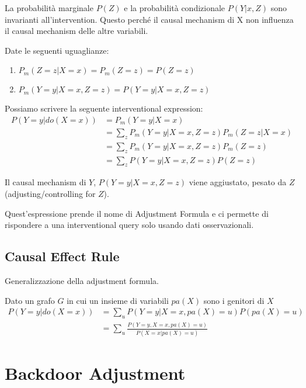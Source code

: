 La probabilità marginale $P(Z)$ e la probabilità condizionale $P(Y|x,Z)$ sono invarianti all'intervention.
Questo perché il causal mechanism di X non influenza il causal mechanism delle altre variabili.

Date le seguenti uguaglianze:

\begin{enumerate}
  \item $P_m(Z=z | X=x) = P_m(Z=z) = P(Z=z)$
  \item $P_m(Y=y|X=x, Z=z) = P(Y=y|X=x, Z=z)$
\end{enumerate}

Possiamo scrivere la seguente interventional expression:
\begin{align*}
  P(Y=y|do(X=x)) & = P_m(Y=y|X=x)                            \\
                 & = \sum_z P_m(Y=y|X=x, Z=z) P_m(Z=z | X=x) \\
                 & = \sum_z P_m(Y=y|X=x, Z=z) P_m(Z=z)       \\
                 & = \sum_z P(Y=y|X=x, Z=z) P(Z=z)
\end{align*}

Il causal mechanism di $Y$,  $P(Y=y|X=x, Z=z)$ viene aggiustato, pesato da $Z$ (adjusting/controlling for $Z$).

Quest'espressione prende il nome di Adjustment Formula e ci permette di rispondere a una interventional query solo usando 
dati osservazionali. 

\subsection*{Causal Effect Rule}
Generalizzazione della adjustment formula.

Dato un grafo $G$ in cui un insieme di variabili $pa(X)$ sono i genitori di $X$
\begin{align*}
  P(Y=y | do(X=x)) & = \sum_u {P(Y=y | X=x, pa(X)=u) P(pa(X)=u)}              \\
                   & = \sum_u {\frac{P(Y=y, X=x, pa(X)=u)}{P(X=x | pa(X)=u)}}
\end{align*}

\section{Backdoor Adjustment}
